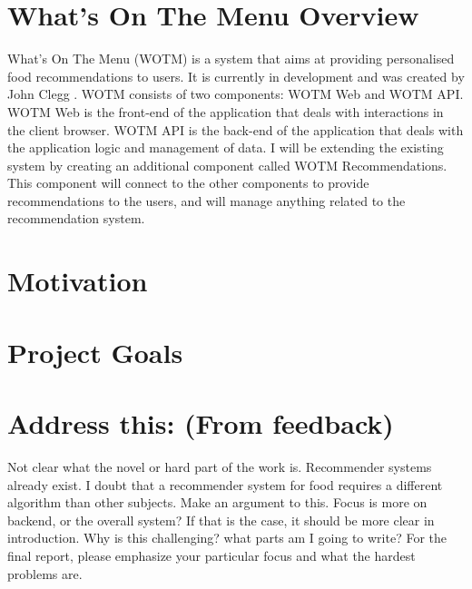 

\section{What's On The Menu Overview}

What's On The Menu (WOTM) is a system that aims at providing personalised food recommendations to users. It is currently in development and was created by John Clegg . WOTM consists of two components: WOTM Web and WOTM API. WOTM Web is the front-end of the application that deals with interactions in the client browser. WOTM API is the back-end of the application that deals with the application logic and management of data. I will be extending the existing system by creating an additional component called WOTM Recommendations. This component will connect to the other components to provide recommendations to the users, and will manage anything related to the recommendation system. 

\section{Motivation}
\section{Project Goals}
\section{Address this: (From feedback)}
Not clear what the novel or hard part of the work is. Recommender systems already exist. I doubt that a recommender system for food requires a different algorithm than other subjects. Make an argument to this.
Focus is more on backend, or the overall system? If that is the case, it should be more clear in introduction. Why is this challenging? 
what parts am I going to write?
For the final report, please emphasize your particular focus and what the hardest problems are. 